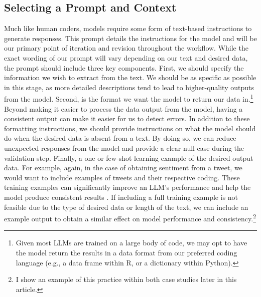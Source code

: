    \subsection{Selecting a Prompt and Context}
    Much like human coders, models require some form of text-based instructions to generate responses. This prompt details the instructions for the model and will be our primary point of iteration and revision throughout the workflow. While the exact wording of our prompt will vary depending on our text and desired data, the prompt should include three key components. First, we should specify the information we wish to extract from the text. We should be as specific as possible in this stage, as more detailed descriptions tend to lead to higher-quality outputs from the model. Second, is the format we want the model to return our data in.\footnote{Given most LLMs are trained on a large body of code, we may opt to have the model return the results in a data format from our preferred coding language (e.g., a data frame within R, or a dictionary within Python).} Beyond making it easier to process the data output from the model, having a consistent output can make it easier for us to detect errors. In addition to these formatting instructions, we should provide instructions on what the model should do when the desired data is absent from a text. By doing so, we can reduce unexpected responses from the model and provide a clear null case during the validation step. Finally, a one or few-shot learning example of the desired output data. For example, again, in the case of obtaining sentiment from a tweet, we would want to include examples of tweets and their respective coding. These training examples can significantly improve an LLM's performance and help the model produce consistent results \citep{brownLanguageModelsAre2020}. If including a full training example is not feasible due to the type of desired data or length of the text, we can include an example output to obtain a similar effect on model performance and consistency.\footnote{I show an example of this practice within both case studies later in this article.}

